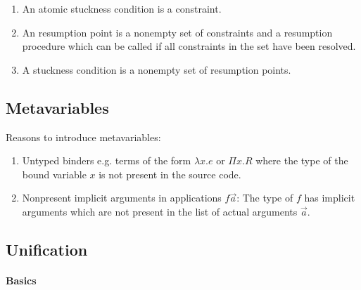 \begin{enumerate}
    \item
        An atomic stuckness condition is a constraint.

    \item An resumption point is a nonempty set of constraints and a
        resumption procedure which can be called if all constraints in the set
        have been resolved.

    \item A stuckness condition is a nonempty set of resumption points.
\end{enumerate}






\subsection{Metavariables}


\begin{comment}
    Holes: Places to fill in terms.

    Metavariables are based on holes with a type. We cannot base a metavariable
    on a hole without type. Reason: We want to construct only welltyped terms.
\end{comment}



Reasons to introduce metavariables:
\begin{enumerate}

    \item Untyped binders e.g. terms of the form $\lambda x. e$ or $\Pi x. R$
        where the type of the bound variable $x$ is not present in the source
        code.

    \item Nonpresent implicit arguments in applications $f \vec a$: The type of
        $f$ has implicit arguments which are not present in the list of actual
        arguments $\vec a$.
\end{enumerate}




\subsection{Unification}


\paragraph{Basics}


